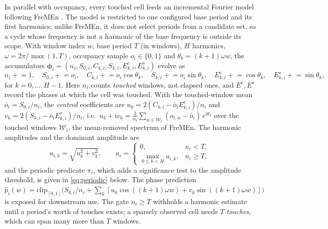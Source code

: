 In parallel with occupancy, every touched cell feeds an incremental Fourier model following FreMEn \citep{krajnik2017fremen}. The model is restricted to one configured base period and its first harmonics; unlike FreMEn, it does not select periods from a candidate set, so a cycle whose frequency is not a harmonic of the base frequency is outside its scope. With window index $w$, base period $T$ (in windows), $H$ harmonics, $\omega=2\pi/\max(1,T)$, occupancy sample $o_i\in\{0,1\}$ and $\theta_k=(k{+}1)\omega w$, the accumulators $\boldsymbol{\phi}_i=(n_i,S_{0,i},C_{k,i},S_{k,i},E^{c}_{k,i},E^{s}_{k,i})$ evolve as
\begin{equation}\label{eq:gather}
  n_i\mathrel{+}=1,\quad S_{0,i}\mathrel{+}=o_i,\quad C_{k,i}\mathrel{+}=o_i\cos\theta_k,\quad S_{k,i}\mathrel{+}=o_i\sin\theta_k,\quad E^{c}_{k,i}\mathrel{+}=\cos\theta_k,\quad E^{s}_{k,i}\mathrel{+}=\sin\theta_k,
\end{equation}
for $k=0,\dots,H{-}1$. Here $n_i$ counts \emph{touched} windows, not elapsed ones, and $E^{c},E^{s}$ record the phases at which the cell was touched. With the touched-window mean $\bar{o}_i=S_{0,i}/n_i$, the \emph{centred} coefficients are $u_k=2(C_{k,i}-\bar{o}_iE^{c}_{k,i})/n_i$ and $v_k=2(S_{k,i}-\bar{o}_iE^{s}_{k,i})/n_i$, i.e.\ $u_k+\mathrm{i}v_k=\tfrac{2}{n_i}\sum_{w\in\mathcal{W}_i}(o_{i,w}-\bar{o}_i)\,e^{\mathrm{i}\theta_k}$ over the touched windows $\mathcal{W}_i$, the mean-removed spectrum of FreMEn. The harmonic amplitudes and the dominant amplitude are
\begin{equation}\label{eq:amp}
  a_{i,k}=\sqrt{u_k^2+v_k^2},\qquad
  a_i=\begin{cases}0, & n_i<T,\\ \max_{0\le k<H}a_{i,k}, & n_i\ge T,\end{cases}
\end{equation}
and the periodic predicate $\pi_i$, which adds a significance test to the amplitude threshold, is given in \eqref{eq:periodic} below.
The phase prediction $\hat{p}_i(w)=\mathrm{clip}_{[0,1]}\big(S_{0,i}/n_i+\sum_k[u_k\cos((k{+}1)\omega w)+v_k\sin((k{+}1)\omega w)]\big)$ is exposed for downstream use. The gate $n_i\ge T$ withholds a harmonic estimate until a period's worth of touches exists; a sparsely observed cell needs $T$ \emph{touches}, which can span many more than $T$ windows.

